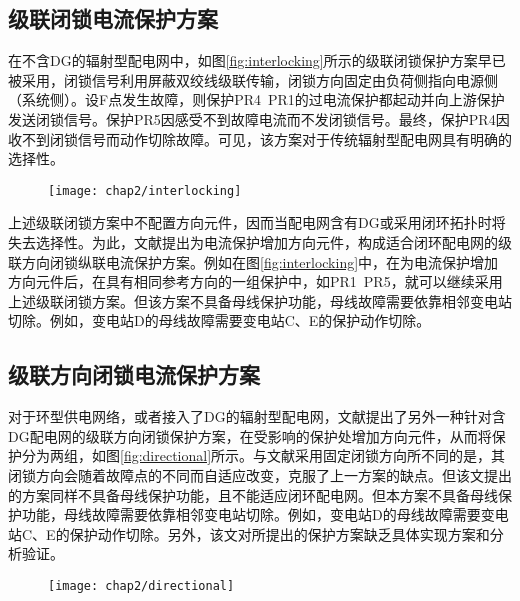 \subsection{级联闭锁电流保护方案}

在不含DG的辐射型配电网中，如图\ref{fig:interlocking}所示的级联闭锁保护方案早已被采用\cite{yong1990optimizing}，闭锁信号利用屏蔽双绞线级联传输，闭锁方向固定由负荷侧指向电源侧（系统侧）。设F点发生故障，则保护PR4~PR1的过电流保护都起动并向上游保护发送闭锁信号。保护PR5因感受不到故障电流而不发闭锁信号。最终，保护PR4因收不到闭锁信号而动作切除故障。可见，该方案对于传统辐射型配电网具有明确的选择性。

\begin{figure}[!htp]
  \centering
  \texttt{[image: chap2/interlocking]}
\end{figure}

上述级联闭锁方案中不配置方向元件，因而当配电网含有DG或采用闭环拓扑时将失去选择性。为此，文献\cite{libin2010han}提出为电流保护增加方向元件，构成适合闭环配电网的级联方向闭锁纵联电流保护方案。例如在图\ref{fig:interlocking}中，在为电流保护增加方向元件后，在具有相同参考方向的一组保护中，如PR1~PR5，就可以继续采用上述级联闭锁方案。但该方案不具备母线保护功能，母线故障需要依靠相邻变电站切除。例如，变电站D的母线故障需要变电站C、E的保护动作切除。

\subsection{级联方向闭锁电流保护方案}

对于环型供电网络，或者接入了DG的辐射型配电网，文献\cite{oudalov2009adaptive}提出了另外一种针对含DG配电网的级联方向闭锁保护方案，在受影响的保护处增加方向元件，从而将保护分为两组，如图\ref{fig:directional}所示。与文献\cite{libin2010han}采用固定闭锁方向所不同的是，其闭锁方向会随着故障点的不同而自适应改变，克服了上一方案的缺点。但该文提出的方案同样不具备母线保护功能，且不能适应闭环配电网。但本方案不具备母线保护功能，母线故障需要依靠相邻变电站切除。例如，变电站D的母线故障需要变电站C、E的保护动作切除。另外，该文对所提出的保护方案缺乏具体实现方案和分析验证。

\begin{figure}[!htp]
  \centering
  \texttt{[image: chap2/directional]}
\end{figure}

